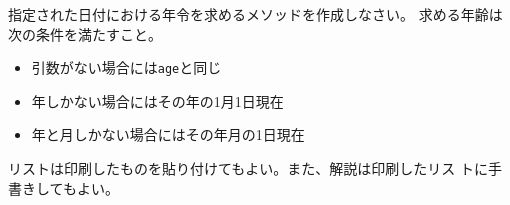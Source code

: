 \begin{Prob}\upshape
 指定された日付における年令を求めるメソッドを作成しなさい。
 求める年齢は次の条件を満たすこと。
 \begin{itemize}
  \item 引数がない場合には\texttt{age}と同じ
  \item 年しかない場合にはその年の1月1日現在
  \item 年と月しかない場合にはその年月の1日現在
 \end{itemize}
\end{Prob}
\ifText リストは印刷したものを貼り付けてもよい。また、解説は印刷したリス
トに手書きしてもよい。
\vspace{0.2\textheight}\fi
